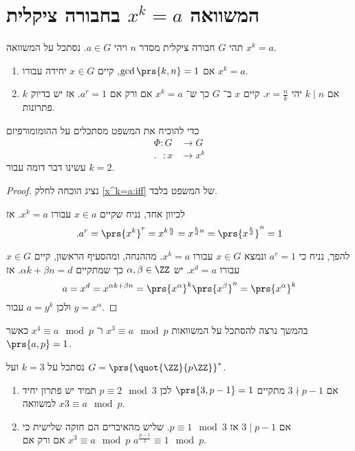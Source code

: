 \documentclass[a4paper,10pt,twoside,openany]{book}
\begin{document}
\section{המשוואה
$x^k = a$
בחבורה ציקלית}

\begin{theorem}
תהי
$G$
חבורה ציקלית מסדר
$n$
ויהי
$a \in G$.
נסתכל על המשוואה
$x^k = a$.
\begin{enumerate}
\item אם
$\gcd\prs{k,n} = 1$,
קיים
$x \in G$
יחידה עבורו
$x^k = a$.
\item אם
$k \mid n$
יהי
$r = \frac{n}{k}$.
קיים
$x$
ב־%
$G$
כך ש־%
$x^k = a$
אם ורק אם
$a^r = 1$.
אז יש בדיוק
$k$
פתרונות.
\label{x^k=a:iff}
\end{enumerate}
\end{theorem}

\begin{remark}
כדי להוכיח את המשפט מסתכלים על ההומומורפיזם
\begin{align*}
\Phi \colon G &\to G \\
\text{.} \phantom{\Phi} \colon x &\to x^k
\end{align*}
עשינו דבר דומה עבור
$k=2$.
\end{remark}
\begin{proof}
נציג הוכחה לחלק \ref{x^k=a:iff} של המשפט בלבד.

לכיוון אחד, נניח שקיים
$x \in a$
עבורו
$x^k = a$.
אז
\[\text{.}a^r = \prs{x^k}^r = x^{k \frac{n}{d}} = x^{\frac{k}{d}n} = \prs{x^{\frac{k}{d}}}^n = 1\]

להפך, נניח כי
$a^r = 1$
ונמצא
$x \in G$
עבורו
$x^k = a$.
מההנחה,
ומהסעיף הראשון, קיים
$x \in G$
עבורו
$x^d = a$.
יש
$\alpha,\beta \in \ZZ$
כך שמתקיים
$\alpha k +\beta n = d$.
אז
\[a = x^d = x^{\alpha k + \beta n} = \prs{x^{\alpha}}^k \prs{x^{\beta}}^n = \prs{x^{\alpha}}^k\]
ולכן
$a = y^k$
עבור
$y = x^{\alpha}$.
\end{proof}

בהמשך נרצה להסתכל על המשוואות
$x^3 \equiv a \mod{p}$
ו־%
$x^4 \equiv a \mod{p}$
כאשר
$\prs{a,p} = 1$.

\begin{example}
נסתכל על
$k = 3$
ועל
$G = \prs{\quot{\ZZ}{p\ZZ}}^*$.
\begin{enumerate}
\item אם
$3 \nmid p-1$
מתקיים
$\prs{3,p-1} = 1$
לכן
$p \equiv 2 \mod{3}$
תמיד יש פתרון יחיד למשוואה
$x3 \equiv a \mod{p}$.
\item אם 
$3 \mid p-1$
אז
$p \equiv 1\mod{3}$.
שליש מהאיברים הם חזקה שלישית כי
$x^3 \equiv a \mod{p}$
אם ורק אם
$a^{\frac{p-1}{3}} \equiv 1 \mod{p}$.
\end{enumerate}
\end{example}
\end{document}
